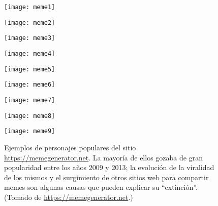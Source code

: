 \begin{figure}[H]
  \centering
  \begin{minipage}[l]{0.3\linewidth}
    \texttt{[image: meme1]}
  \end{minipage}\hfill
  \begin{minipage}[r]{0.3\linewidth}
    \texttt{[image: meme2]}
  \end{minipage}\hfill
  \begin{minipage}[r]{0.3\linewidth}
    \texttt{[image: meme3]}
  \end{minipage}
  \begin{minipage}[r]{0.3\linewidth}
    \texttt{[image: meme4]}
  \end{minipage}\hfill
  \begin{minipage}[r]{0.3\linewidth}
    \texttt{[image: meme5]}
  \end{minipage}\hfill
  \begin{minipage}[r]{0.3\linewidth}
    \texttt{[image: meme6]}
  \end{minipage}
  \begin{minipage}[r]{0.3\linewidth}
    \texttt{[image: meme7]}
  \end{minipage}\hfill
  \begin{minipage}[r]{0.3\linewidth}
    \texttt{[image: meme8]}
  \end{minipage}\hfill
  \begin{minipage}[r]{0.3\linewidth}
    \texttt{[image: meme9]}
  \end{minipage}
  \caption{
    Ejemplos de personajes populares del sitio \url{https://memegenerator.net}.
    La mayoría de ellos gozaba de gran popularidad entre los años 2009 y 2013;
    la evolución de la viralidad de los mismos y el surgimiento de otros sitios web
    para compartir memes son algunas causas que pueden explicar su ``extinción''.
    (Tomado de \url{https://memegenerator.net}.)
  }
  \label{meme-characters}
\end{figure}

